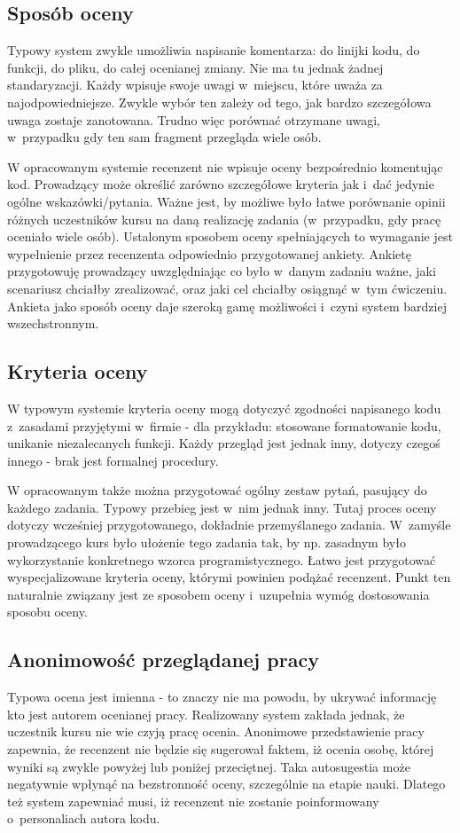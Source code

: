 \subsection{Sposób oceny}
Typowy system zwykle umożliwia napisanie komentarza: do linijki kodu, do funkcji, do pliku, do całej ocenianej zmiany. Nie ma tu jednak żadnej standaryzacji. Każdy wpisuje swoje uwagi w~miejscu, które uważa za najodpowiedniejsze. Zwykle wybór ten zależy od tego, jak bardzo szczegółowa uwaga zostaje zanotowana. Trudno więc porównać otrzymane uwagi, w~przypadku gdy ten sam fragment przegląda wiele osób. 

\medskip
W opracowanym systemie recenzent nie wpisuje oceny bezpośrednio komentując kod. Prowadzący może określić zarówno szczegółowe kryteria jak i~dać jedynie ogólne wskazówki/pytania. Ważne jest, by możliwe było łatwe porównanie opinii różnych uczestników kursu na daną realizację zadania (w~przypadku, gdy pracę oceniało wiele osób). Ustalonym sposobem oceny spełniających to wymaganie jest wypełnienie przez recenzenta odpowiednio przygotowanej ankiety. Ankietę przygotowuję prowadzący uwzględniając co było w~danym zadaniu ważne, jaki scenariusz chciałby zrealizować, oraz jaki cel chciałby osiągnąć w~tym ćwiczeniu. Ankieta jako sposób oceny daje szeroką gamę możliwości i~czyni system bardziej wszechstronnym.

\subsection{Kryteria oceny}
W typowym systemie kryteria oceny mogą dotyczyć zgodności napisanego kodu z~zasadami przyjętymi w~firmie - dla przykładu: stosowane formatowanie kodu, unikanie niezalecanych funkcji. Każdy przegląd jest jednak inny, dotyczy czegoś innego - brak jest formalnej procedury. 

\medskip
W opracowanym także można przygotować ogólny zestaw pytań, pasujący do każdego zadania. Typowy przebieg jest w~nim jednak inny. Tutaj proces oceny dotyczy wcześniej przygotowanego, dokładnie przemyślanego zadania. W~zamyśle prowadzącego kurs było ułożenie tego zadania tak, by np. zasadnym było wykorzystanie konkretnego wzorca programistycznego. Łatwo jest przygotować wyspecjalizowane kryteria oceny, którymi powinien podążać recenzent. Punkt ten naturalnie związany jest ze sposobem oceny i~uzupełnia wymóg dostosowania sposobu oceny.

\subsection{Anonimowość przeglądanej pracy}
Typowa ocena jest imienna - to znaczy nie ma powodu, by ukrywać informację kto jest autorem ocenianej pracy. Realizowany system zakłada jednak, że uczestnik kursu nie wie czyją pracę ocenia. Anonimowe przedstawienie pracy zapewnia, że recenzent nie będzie się sugerował faktem, iż ocenia osobę, której wyniki są zwykle powyżej lub poniżej przeciętnej. Taka autosugestia może negatywnie wpłynąć na bezstronność oceny, szczególnie na etapie nauki. Dlatego też system zapewniać musi, iż recenzent nie zostanie poinformowany o~personaliach autora kodu.


